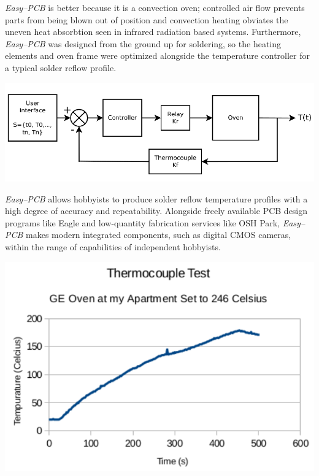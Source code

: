 \documentclass[10pt, twocolumn]{article}
\begin{document}
\emph{Easy--PCB} is better because it is a convection oven;
controlled air flow prevents parts from being blown out of position and
convection heating obviates the uneven heat absorbtion seen in infrared radiation based systems.
Furthermore, \emph{Easy--PCB} was designed from the ground up for soldering,
so the heating elements and oven frame were optimized alongside the
temperature controller for a typical solder reflow profile.

\begin{center}
	\includegraphics[width=\columnwidth]{Figures/control-system.pdf}
\end{center}

\emph{Easy--PCB} allows hobbyists to produce solder reflow temperature profiles with
a high degree of accuracy and repeatability.
Alongside freely available PCB design programs like Eagle and low-quantity
fabrication services like OSH Park, \emph{Easy--PCB} makes
modern integrated components, such as digital CMOS cameras,
within the range of capabilities of independent hobbyists.

\begin{center}
	\includegraphics[width=\columnwidth]{Figures/control-results.pdf}
\end{center}
\end{document}
